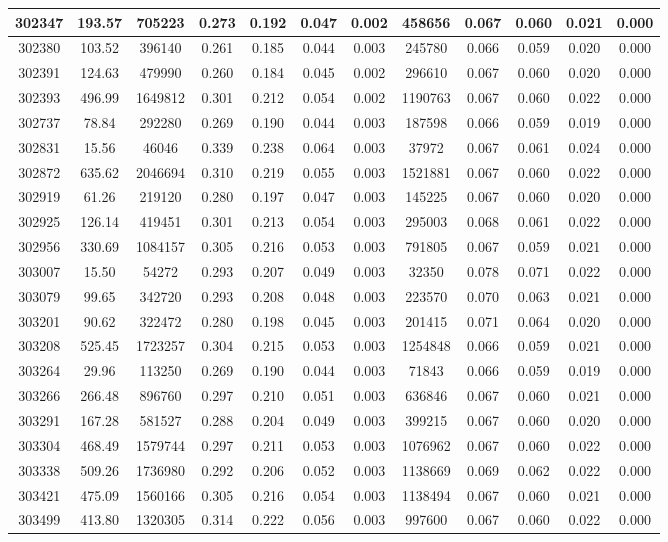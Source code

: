 \documentclass[10pt]{extarticle}
\begin{document}
\begin{longtable}{|c|c|c|c|c|c|c|c|c|c|c|c|}
\hline 
302347&193.57&705223&0.273&0.192&0.047&0.002&458656&0.067&0.060&0.021&0.000 \\ 
\hline 
302380&103.52&396140&0.261&0.185&0.044&0.003&245780&0.066&0.059&0.020&0.000 \\ 
\hline 
302391&124.63&479990&0.260&0.184&0.045&0.002&296610&0.067&0.060&0.020&0.000 \\ 
\hline 
302393&496.99&1649812&0.301&0.212&0.054&0.002&1190763&0.067&0.060&0.022&0.000 \\ 
\hline 
302737&78.84&292280&0.269&0.190&0.044&0.003&187598&0.066&0.059&0.019&0.000 \\ 
\hline 
302831&15.56&46046&0.339&0.238&0.064&0.003&37972&0.067&0.061&0.024&0.000 \\ 
\hline 
302872&635.62&2046694&0.310&0.219&0.055&0.003&1521881&0.067&0.060&0.022&0.000 \\ 
\hline 
302919&61.26&219120&0.280&0.197&0.047&0.003&145225&0.067&0.060&0.020&0.000 \\ 
\hline 
302925&126.14&419451&0.301&0.213&0.054&0.003&295003&0.068&0.061&0.022&0.000 \\ 
\hline 
302956&330.69&1084157&0.305&0.216&0.053&0.003&791805&0.067&0.059&0.021&0.000 \\ 
\hline 
303007&15.50&54272&0.293&0.207&0.049&0.003&32350&0.078&0.071&0.022&0.000 \\ 
\hline 
303079&99.65&342720&0.293&0.208&0.048&0.003&223570&0.070&0.063&0.021&0.000 \\ 
\hline 
303201&90.62&322472&0.280&0.198&0.045&0.003&201415&0.071&0.064&0.020&0.000 \\ 
\hline 
303208&525.45&1723257&0.304&0.215&0.053&0.003&1254848&0.066&0.059&0.021&0.000 \\ 
\hline 
303264&29.96&113250&0.269&0.190&0.044&0.003&71843&0.066&0.059&0.019&0.000 \\ 
\hline 
303266&266.48&896760&0.297&0.210&0.051&0.003&636846&0.067&0.060&0.021&0.000 \\ 
\hline 
303291&167.28&581527&0.288&0.204&0.049&0.003&399215&0.067&0.060&0.020&0.000 \\ 
\hline 
303304&468.49&1579744&0.297&0.211&0.053&0.003&1076962&0.067&0.060&0.022&0.000 \\ 
\hline 
303338&509.26&1736980&0.292&0.206&0.052&0.003&1138669&0.069&0.062&0.022&0.000 \\ 
\hline 
303421&475.09&1560166&0.305&0.216&0.054&0.003&1138494&0.067&0.060&0.021&0.000 \\ 
\hline 
303499&413.80&1320305&0.314&0.222&0.056&0.003&997600&0.067&0.060&0.022&0.000 \\ 

\end{longtable}
\end{document}
